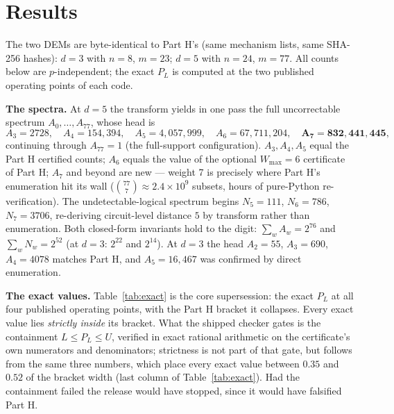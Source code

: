 \documentclass[11pt]{amsart}
\newcommand{\PL}{P_{L}}
\theoremstyle{plain}
\theoremstyle{definition}
\theoremstyle{remark}
\begin{document}
\section{Results}\label{sec:results}

The two DEMs are byte-identical to Part H's (same mechanism lists, same
SHA-256 hashes): $d = 3$ with $n = 8$, $m = 23$; $d = 5$ with $n = 24$,
$m = 77$. All counts below are $p$-independent; the exact $\PL$ is computed
at the two published operating points of each code.

\textbf{The spectra.} At $d = 5$ the transform yields in one pass the full
uncorrectable spectrum $A_0, \dots, A_{77}$, whose head is
\[
A_3 = 2728, \quad A_4 = 154{,}394, \quad A_5 = 4{,}057{,}999, \quad
A_6 = 67{,}711{,}204, \quad \mathbf{A_7 = 832{,}441{,}445},
\]
continuing through $A_{77} = 1$ (the full-support configuration). $A_3,
A_4, A_5$ equal the Part H certified counts; $A_6$ equals the value of the
optional $W_{\max} = 6$ certificate of Part H; $A_7$ and beyond are new ---
weight 7 is precisely where Part H's enumeration hit its wall
($\binom{77}{7} \approx 2.4 \times 10^9$ subsets, hours of pure-Python
re-verification). The undetectable-logical spectrum begins $N_5 = 111$,
$N_6 = 786$, $N_7 = 3706$, re-deriving circuit-level distance $5$ by
transform rather than enumeration. Both closed-form invariants hold to the
digit: $\sum_w A_w = 2^{76}$ and $\sum_w N_w = 2^{52}$ (at $d=3$: $2^{22}$
and $2^{14}$). At $d = 3$ the head $A_2 = 55$, $A_3 = 690$, $A_4 = 4078$
matches Part H, and $A_5 = 16{,}467$ was confirmed by direct enumeration.

\textbf{The exact values.} Table~\ref{tab:exact} is the core supersession:
the exact $\PL$ at all four published operating points, with the Part H
bracket it collapses. Every exact value lies \emph{strictly inside} its
bracket. What the shipped checker gates is the containment $L \le \PL \le U$,
verified in exact rational arithmetic on the certificate's own numerators and
denominators; strictness is not part of that gate, but follows from the same
three numbers, which place every exact value between $0.35$ and $0.52$ of the
bracket width (last column of Table~\ref{tab:exact}). Had the containment
failed the release would have stopped, since it would have falsified Part H.
\end{document}
